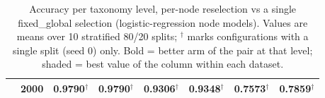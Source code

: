 \begin{table}[t]
\begin{tabular}{lrrrrrrr}
 & 2000 & \cellcolor{palegreen}0.9790$^\dagger$ & 0.9790$^\dagger$ & 0.9306$^\dagger$ & \textbf{0.9348$^\dagger$} & 0.7573$^\dagger$ & \textbf{0.7859$^\dagger$} \\
\bottomrule
\end{tabular}
\caption{Accuracy per taxonomy level, per-node reselection vs a single fixed\_global selection (logistic-regression node models). Values are means over 10 stratified 80/20 splits; $^\dagger$ marks configurations with a single split (seed 0) only. Bold = better arm of the pair at that level; shaded = best value of the column within each dataset.}
\label{tab:reselect-vs-fixed-accuracy}
\end{table}
